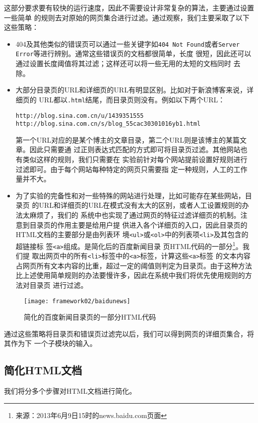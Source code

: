 这部分要求要有较快的运行速度，因此不需要设计非常复杂的算法，主要通过设置一些简单
的规则去对原始的网页集合进行过滤。通过观察，我们主要采取了以下这些策略：
\begin{itemize}
\item 404及其他类似的错误页可以通过一些关键字如\texttt{404 Not
    Found}或者\texttt{Server Error}等进行辨别。通常这些错误页的文档都很简单，长度
  很短，因此还可以通过设置长度阈值将其过滤；这样还可以将一些无用的太短的文档同时
  去除。
\item 大部分目录页的URL和详细页的URL有明显区别。比如对于新浪博客来说，详细页的
  URL都以\texttt{.html}结尾，而目录页则没有。例如以下两个URL：
\begin{verbatim}
http://blog.sina.com.cn/u/1439351555
http://blog.sina.com.cn/s/blog_55cac30301016yb1.html
\end{verbatim}
第一个URL对应的是某个博主的文章目录，第二个URL则是该博主的某篇文章。因此只需要通
过正则表达式匹配的方式即可将目录页过滤。其他网站也有类似这样的规则，我们只需要在
实验前针对每个网站提前设置好规则进行过滤即可。由于每个网站每种特定的网页只需要指
定一种规则，人工的工作量并不大。
\item 为了实验的完备性和对一些特殊的网站进行处理，比如可能存在某些网站，目录页
  的URL和详细页的URL在模式没有太大的区别，或者人工设置规则的办法太麻烦了，我们的
  系统中也实现了通过网页的特征过滤详细页的机制。注意到目录页的作用主要是给用户提
  供进入各个详细页的入口，因此目录页的HTML文档的主要部分是由列表环
  境\texttt{<ul>}或\texttt{<ol>}中的列表项\texttt{<li>}及其包含的超链接标
  签\texttt{<a>}组成。是简化后的百度新闻目录
  页HTML代码的一部分\footnote{来源：2013年6月9日15时的news.baidu.com页面}。我们提
  取出网页中的所有\texttt{<li>}标签中的\texttt{<a>}标签，计算这些\texttt{<a>}标签
  的文本内容占网页所有文本内容的比重，超过一定的阈值则判定为目录页。由于这种方法
  比上述使用简单规则的办法要慢许多，因此在系统中我们将优先使用规则的方法对目录页
  进行过滤。
\end{itemize}
\begin{figure}
  \centering
  \texttt{[image: framework02/baidunews]}
  \caption{简化的百度新闻目录页的一部分HTML代码}
  \label{framework:fig:baidunews}
\end{figure}

通过这些策略将目录页和错误页过滤完以后，我们可以得到网页的详细页集合，将其作为下
一个子模块的输入。
\subsection{简化HTML文档}
我们将分多个步骤对HTML文档进行简化。


